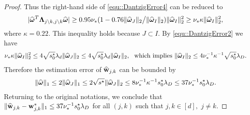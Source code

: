 \documentclass[twoside,11pt]{article}
\newcommand*{\homega}{\hat{\bomega}}
\newcommand*{\hw}{\hat{\wb}}
\newcommand*{\sw}{\wb^*}
\begin{document}
\begin{proof}
Thus the right-hand side of \eqref{equ::DantzigError4} can be reduced to 
\begin{align}\label{equ::DantzigError2}
  | \homega^T\bLambda_{j \setminus k,j \setminus k} \homega |   \geq 0.95\nu_*  ( 1 - 0.76 \| \homega_{J}  \|_2\big/   \| \homega_I  \|_2 ) \| \homega_I \|_2 ^2 \geq  \nu_*\kappa \| \homega_I \|_2^2 ,
\end{align}
where $\kappa = 0.22.$ This inequality holds because $J\subset I.$
By \eqref{equ::DantzigError2} we have 
\begin{align*}
\nu_*\kappa \| \homega_I  \|_2^2 \leq 4\sqrt{s_0^\star} \lambda _d \|\homega_J  \|_2 \leq 4\sqrt{s_0^\star} \lambda _d  \|\homega_I  \|_2 ,~~\text{which implies}~ \|\homega_I  \|_2 \leq 4\nu_*^{-1} \kappa^{-1} \sqrt{s_0^\star}  \lambda_D.
\end{align*}
Therefore the estimation error of $\hw_{j,k}$ can be bounded by
\begin{align*}
  \| \homega  \|_1 \leq 2   \| \homega_J  \|_1 \leq 2 \sqrt{s^\star}  \| \homega_J   \|_2 \leq 8\nu_*^{-1} \kappa^{-1}s_0^\star\lambda_D \leq 37\nu_*^{-1} s_0^\star\lambda_D.
\end{align*}
Returning to the original notations, we  conclude that $ \| \hw_{j,k} - \sw_{j,k}  \|_1 \leq 37 \nu_*^{-1} s_0^\star\lambda_D$ for all $(j,k)$ such that $j,k\!\in\![d], $ $j\neq k.$
\end{proof}
\end{document}

